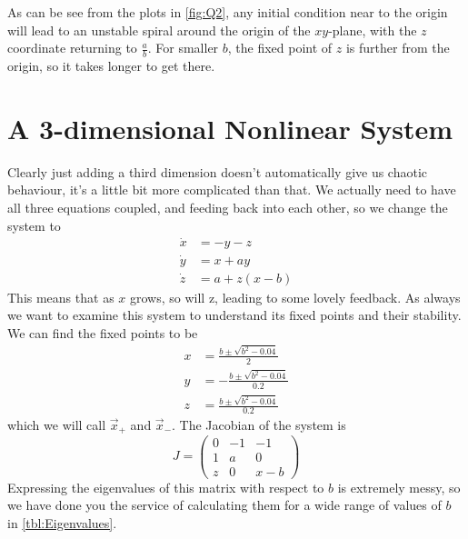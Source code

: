 \documentclass[12pt]{article}
\numberwithin{equation}{section}
\numberwithin{figure}{section}
\numberwithin{table}{section}
\begin{document}
    As can be see from the plots in \autoref{fig:Q2}, any initial condition near to the origin 
    will lead to an unstable spiral around the origin of the $xy$-plane, with the $z$ coordinate 
    returning to $\frac{a}{b}$. For smaller $b$, the fixed point of $z$ is further from the origin, 
    so it takes longer to get there. 

    \section{A 3-dimensional Nonlinear System}\label{sec:3D Nonlinear}
    Clearly just adding a third dimension doesn't automatically give us chaotic behaviour, it's 
    a little bit more complicated than that. We actually need to have all three equations coupled, 
    and feeding back into each other, so we change the system to
    \begin{align*}
        \dot x&=-y-z\\
        \dot y&=x+ay\\
        \dot z&=a+z(x-b)
    \end{align*}
    This means that as $x$ grows, so will z, leading to some lovely feedback. As always we want 
    to examine this system to understand its fixed points and their stability. We can find the 
    fixed points to be 
    \begin{align*}
        x&=\frac{b\pm\sqrt{b^2-0.04}}{2}\\
        y&=-\frac{b\pm\sqrt{b^2-0.04}}{0.2}\\
        z&=\frac{b\pm\sqrt{b^2-0.04}}{0.2}
    \end{align*}
    which we will call $\vec x_+$ and $\vec x_-$. The Jacobian of the system is
    \begin{equation}
        J=
        \begin{pmatrix}
            0 & -1 & -1\\
            1 & a & 0 \\
            z & 0 & x-b
        \end{pmatrix}
        \label{eqn:3D Nonlinear Jacobian}
    \end{equation}
    Expressing the eigenvalues of this matrix with respect to $b$ is extremely messy, so we have 
    done you the service of calculating them for a wide range of values of $b$ in \autoref{tbl:Eigenvalues}.
\end{document}
